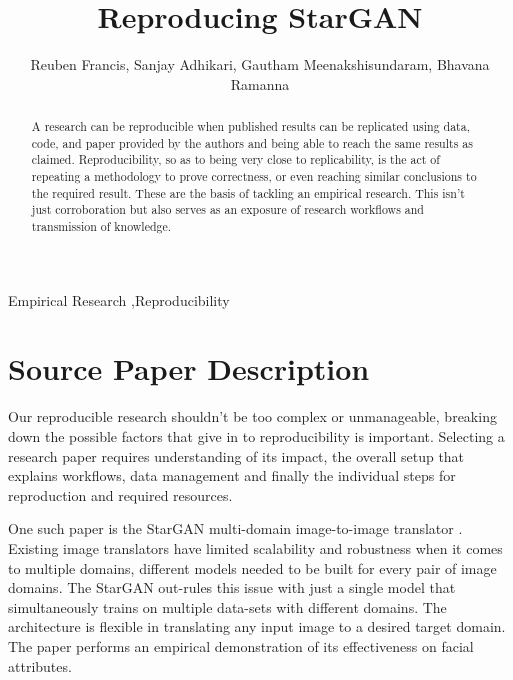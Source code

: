 \documentclass[preprint,12pt]{elsarticle}
\begin{document}
\begin{frontmatter}

\title{Reproducing StarGAN}

\author{Reuben Francis, Sanjay Adhikari, Gautham Meenakshisundaram, Bhavana Ramanna}

\address{Macquarie University}

\begin{abstract}
A research can be reproducible when published results can be replicated using data, code, and paper provided by the authors and being able to reach the same results as claimed. Reproducibility, so as to being very close to replicability, is the act of repeating a methodology to prove correctness, or even reaching similar conclusions to the required result. These are the basis of tackling an empirical research\cite{gitbook_bot_2018_1212538}. This isn't just corroboration but also serves as an exposure of research workflows and transmission of knowledge. 
\end{abstract}

\begin{keyword}
Empirical Research \sep Reproducibility

\end{keyword}

\end{frontmatter}

\section{Source Paper Description}
\label{S:1}

Our reproducible research shouldn't be too complex or unmanageable, breaking down the possible factors that give in to reproducibility is important. Selecting a research paper requires understanding of its impact, the overall setup that explains workflows, data management and finally the individual steps for reproduction and required resources. 

One such paper is the StarGAN multi-domain image-to-image translator \cite{StarGAN2018}. Existing image translators have limited scalability and robustness when it comes to multiple domains, different models needed to be built for every pair of image domains. The StarGAN out-rules this issue with just a single model that simultaneously trains on multiple data-sets with different domains. The architecture is flexible in translating any input image to a desired target domain. The paper performs an empirical demonstration of its effectiveness on facial attributes. 
\end{document}
